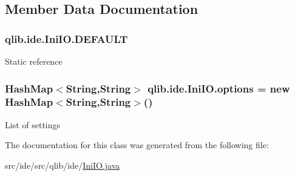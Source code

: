 \subsection{Member Data Documentation}
\subsubsection[{\texorpdfstring{D\+E\+F\+A\+U\+LT}{DEFAULT}}]{ qlib.\+ide.\+Ini\+I\+O.\+D\+E\+F\+A\+U\+LT\hspace{0.3cm}{\ttfamily [static]}}\hypertarget{classqlib_1_1ide_1_1IniIO_a632b3fd3f02261c98a2aecf793c956a5}{}\label{classqlib_1_1ide_1_1IniIO_a632b3fd3f02261c98a2aecf793c956a5}
Static reference 
\subsubsection[{\texorpdfstring{options}{options}}]{\setlength{\rightskip}{0pt plus 5cm}Hash\+Map$<$String,String$>$ qlib.\+ide.\+Ini\+I\+O.\+options = new Hash\+Map$<$String,String$>$()\hspace{0.3cm}{\ttfamily [private]}}\hypertarget{classqlib_1_1ide_1_1IniIO_a8676d10eea865975fca03579a63b9831}{}\label{classqlib_1_1ide_1_1IniIO_a8676d10eea865975fca03579a63b9831}
List of settings 

The documentation for this class was generated from the following file\+:\begin{DoxyCompactItemize}
\item 
src/ide/src/qlib/ide/\hyperlink{IniIO_8java}{Ini\+I\+O.\+java}\end{DoxyCompactItemize}
